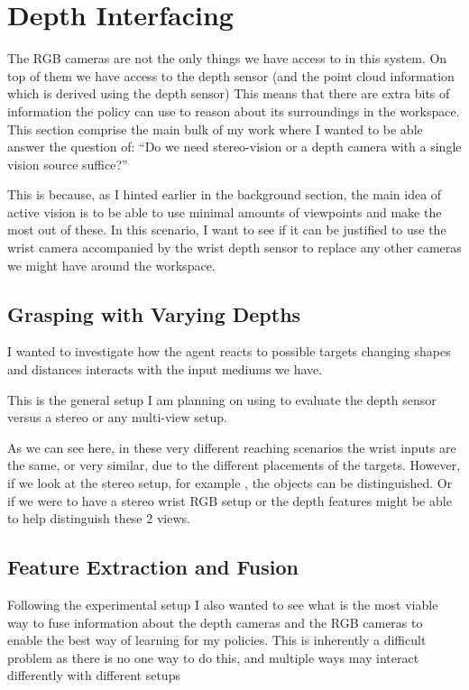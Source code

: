 \section{Depth Interfacing}
The RGB cameras are not the only things we have access to in this system. On top of them we have access to the depth sensor (and the point cloud information which is derived using the depth sensor)
This means that there are extra bits of information the policy can use to reason about its surroundings in the workspace. This section comprise the main bulk of my work where I wanted to be able answer the question of: ``Do we need stereo-vision or a depth camera with a single vision source suffice?''

This is because, as I hinted earlier in the background section, the main idea of active vision is to be able to use minimal amounts of viewpoints and make the most out of these. In this scenario, I want to see if it can be justified to use the wrist camera accompanied by the wrist depth sensor to replace any other cameras we might have around the workspace.

\subsection{Grasping with Varying Depths}
I wanted to investigate how the agent reacts to possible targets changing shapes and distances interacts with the input mediums we have.

This is the general setup I am planning on using to evaluate the depth sensor versus a stereo or any multi-view setup.

As we can see here, in these very different reaching scenarios  the wrist inputs are the same, or very similar, due to the different placements of the targets. However, if we look at the stereo setup, for example , the objects can be distinguished. Or if we were to have a stereo wrist RGB setup  or  the depth features might be able to help distinguish these 2 views.

\subsection{Feature Extraction and Fusion}
Following the experimental setup I also wanted to see what is the most viable way to fuse information about the depth cameras and the RGB cameras to enable the best way of learning for my policies. This is inherently a difficult problem as there is no one way to do this, and multiple ways may interact differently with different setups

